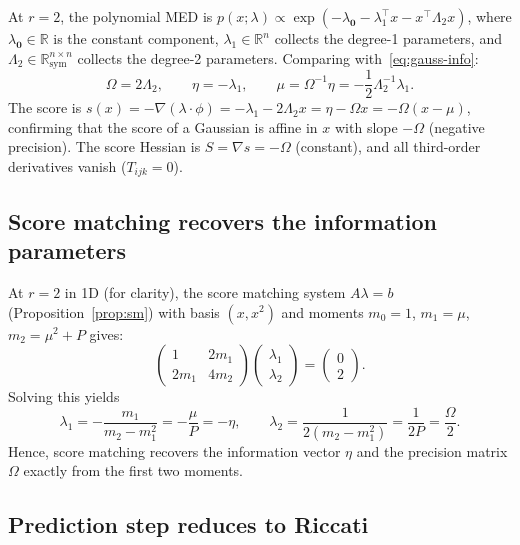 \documentclass{article}
\newcommand{\R}{\mathbb{R}}
\theoremstyle{definition}
\begin{document}
At $r = 2$, the polynomial MED is
$p(x;\lambda) \propto \exp(-\lambda_{\mathbf{0}} - \lambda_1^\top x - x^\top \Lambda_2 x)$,
where $\lambda_{\mathbf{0}} \in \R$ is the constant component, $\lambda_1 \in \R^n$ collects the degree-1 parameters, and
$\Lambda_2 \in \R^{n\times n}_{\mathrm{sym}}$ collects the degree-2 parameters.
Comparing with~\eqref{eq:gauss-info}:
\begin{equation}\label{eq:lambda-info-map}
    \Omega = 2\Lambda_2, \qquad \eta = -\lambda_1, \qquad
    \mu = \Omega^{-1}\eta = -\frac{1}{2}\Lambda_2^{-1}\lambda_1.
\end{equation}
The score is $s(x) = -\nabla(\lambda \cdot \phi) = -\lambda_1 - 2\Lambda_2 x
= \eta - \Omega x = -\Omega(x - \mu)$,
confirming that the score of a Gaussian is affine in $x$ with
slope $-\Omega$ (negative precision).
The score Hessian is $S = \nabla s = -\Omega$ (constant),
and all third-order derivatives vanish ($T_{ijk} = 0$).

\subsection{Score matching recovers the information parameters}\label{app:sm-recovers}

At $r = 2$ in 1D (for clarity), the score matching system
$A\lambda = b$ (Proposition~\ref{prop:sm}) with basis $(x, x^2)$
and moments $m_0 = 1$, $m_1 = \mu$, $m_2 = \mu^2 + P$ gives:
\[
    \begin{pmatrix} 1 & 2m_1 \\ 2m_1 & 4m_2 \end{pmatrix}
    \begin{pmatrix} \lambda_1 \\ \lambda_2 \end{pmatrix}
    = \begin{pmatrix} 0 \\ 2 \end{pmatrix}.
\]
Solving this yields
\begin{equation}
    \lambda_1 = -\frac{m_1}{m_2 - m_1^2} = -\frac{\mu}{P} = -\eta,
    \qquad
    \lambda_2 = \frac{1}{2(m_2 - m_1^2)} = \frac{1}{2P} = \frac{\Omega}{2}.
\end{equation}
Hence, score matching recovers the information vector $\eta$ and the precision matrix $\Omega$ exactly
from the first two moments.

\subsection{Prediction step reduces to Riccati}\label{app:riccati}
\end{document}
